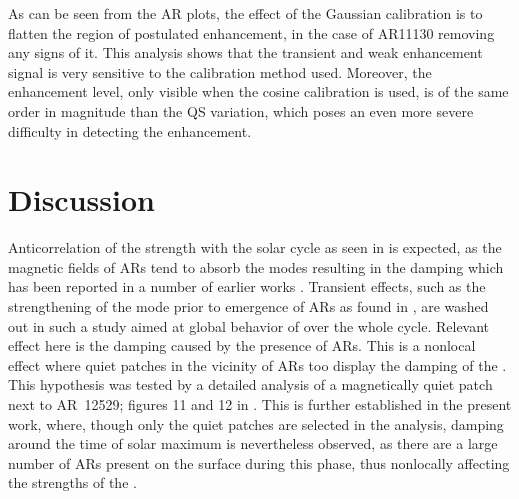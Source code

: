 \documentclass{aa}
\begin{document}
As can be seen
from the AR \fff plots, the effect of the Gaussian calibration is
to flatten the region of postulated enhancement, in the case of AR11130
removing any signs of it. This analysis shows that the transient
and weak enhancement signal is very sensitive to the calibration
method used. Moreover, the enhancement level, only visible
when the cosine calibration is used, is of the same order 
in magnitude than
the QS variation, which poses an even more severe difficulty in
detecting the enhancement.


\section{Discussion}

Anticorrelation of the \fff strength with the solar cycle as seen in 
is expected, as the magnetic fields of ARs tend to absorb the modes resulting in the
\fff damping which has been reported in a number of earlier works
\citep{Cally+94,CB97,SRB16}. Transient effects, such as the strengthening of the mode
prior to emergence of ARs as found in \citet{SRB16}, are washed out in such a study aimed
at global behavior of \fff over the whole cycle. Relevant effect here is the damping
caused by the presence of ARs. This is a nonlocal effect where quiet patches in the
vicinity of ARs too display the damping of the \fff. This hypothesis was tested
by a detailed analysis of a magnetically quiet patch next to AR~12529; figures 11 and 12
in \citet{SRB16}. This is further established in the present work, where, though only the
quiet patches are selected in the analysis, damping around the time of solar maximum is
nevertheless observed, as there are a large number of ARs present on the surface during this
phase, thus nonlocally affecting the strengths of the \fff.
\end{document}
